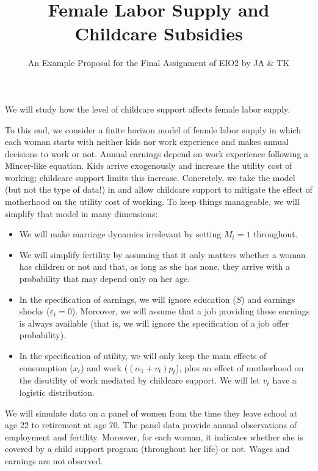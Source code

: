 \documentclass[fleqn,12pt]{article}
\title{Female Labor Supply and Childcare Subsidies}
\author{An Example Proposal for the Final Assignment of EIO2 by JA \& TK}
\date{}
\begin{document}
\maketitle

We will study how the level of childcare support affects female labor supply.

To this end, we consider a finite horizon model of female labor supply in which each woman starts with neither kids nor work experience and makes annual decisions to work or not. Annual earnings depend on work experience following a Mincer-like equation. Kids arrive exogenously and increase the utility cost of working; childcare support limits this increase. Concretely, we take the model (but not the type of data!) in \citet[][Section 3]{ecma11:ecksteinwolpin} and allow childcare support to mitigate the effect of motherhood on the utility cost of working. To keep things manageable, we will simplify that model in many dimensions:
\begin{itemize}
\item We will make marriage dynamics irrelevant by setting  $M_t=1$ throughout.
\item We will simplify fertility by assuming that it only matters whether a woman has children or not and that, as long as she has none, they arrive with a probability that may depend only on her age. 
\item In the specification of earnings, we will ignore education ($S$) and earnings shocks ($\varepsilon_t=0$). Moreover, we will assume that a job providing these earnings is always available (that is, we will ignore the specification of a job offer probability).
\item In the specification of utility, we will only keep the main effects of consumption ($x_t$) and work ($(\alpha_1+v_t)p_t$), plus an effect of motherhood on the disutility of work mediated by childcare support. We will let $v_t$ have a logistic distribution.
\end{itemize}

We will simulate data on a panel of women from the time they leave school at age 22 to retirement at age 70. The panel data provide annual observations of employment and fertility. Moreover, for each woman, it indicates whether she is covered by a child support program (throughout her life) or not. Wages and earnings are not observed. 



\end{document}
